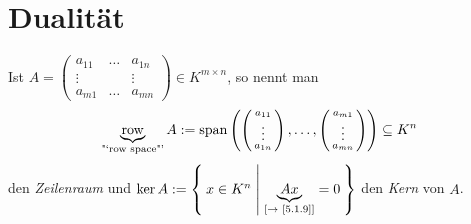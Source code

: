 \documentclass[../../main.tex]{subfiles}
\begin{document}

\section{Dualität}

\begin{df}\label{5.3.1}
Ist $A=\begin{pmatrix}
a_{11} & \ldots & a_{1n}\\
\vdots & & \vdots\\
a_{m1} & \ldots & a_{mn}
\end{pmatrix}\in K^{m\times n}$, so nennt man 
$$\underbrace{\operatorname{row}}_\text{"`row space"'} A:=\operatorname{span}\left(\left(\begin{smallmatrix}a_{11}\\\vdots\\a_{1n}\end{smallmatrix}\right),\ldots,\left(\begin{smallmatrix}a_{m1}\\\vdots\\a_{mn}\end{smallmatrix}\right)\right)\subseteq K^n$$
den \emph{Zeilenraum} und $\ker A:=\Set{x\in K^n | \underbrace{Ax}_\text{[$\to$ \ref{5.1.9}]}=0}$ den \emph{Kern} von $A$.
\end{df}
\end{document}
